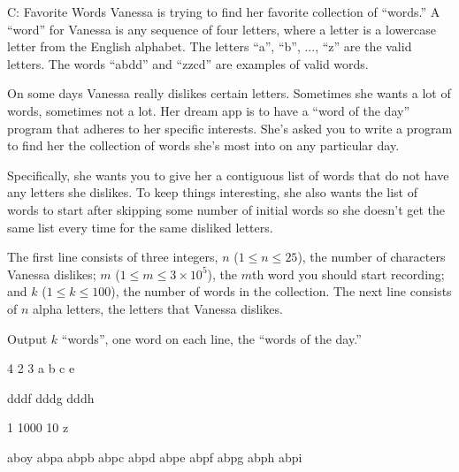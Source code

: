 \begin{problem}{C: Favorite Words}
Vanessa is trying to find her favorite collection of ``words.''
A ``word'' for Vanessa is any sequence of four letters, where a letter is a lowercase letter from the English alphabet.
The letters ``a'', ``b'', ..., ``z'' are the valid letters.
The words ``abdd'' and ``zzcd'' are examples of valid words.

On some days Vanessa really dislikes certain letters.
Sometimes she wants a lot of words, sometimes not a lot.
Her dream app is to have a ``word of the day'' program that adheres to her specific interests.
She's asked you to write a program to find her the collection of words she's most into on any particular day.

Specifically, she wants you to give her a contiguous list of words that do not have any letters she dislikes.
To keep things interesting, she also wants the list of words to start after skipping some number of initial words so she doesn't get the same list every time for the same disliked letters.
\end{problem}

\begin{formalin}
The first line consists of three integers, $n$ ($1 \leq n \leq 25$), the number of characters Vanessa dislikes; $m$ ($1 \leq m \leq 3 \times 10^5$), the $m$th word you should start recording; and $k$ ($1 \leq k \leq 100$), the number of words in the collection.
The next line consists of $n$ alpha letters, the letters that Vanessa dislikes.
\end{formalin}

\begin{formalout}
Output $k$ ``words'', one word on each line, the ``words of the day.''
\end{formalout}

\begin{datain}
4 2 3
a b c e
\end{datain}
\begin{dataout}
dddf
dddg
dddh
\end{dataout}

\begin{datain}
1 1000 10
z
\end{datain}
\begin{dataout}
aboy
abpa
abpb
abpc
abpd
abpe
abpf
abpg
abph
abpi
\end{dataout}
